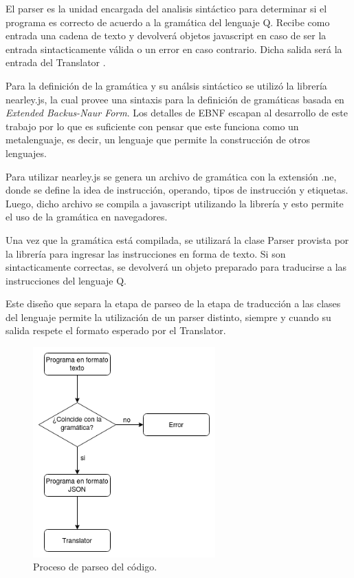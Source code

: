 El parser es la unidad encargada del analisis sintáctico para determinar si el programa es correcto de acuerdo a la gramática del lenguaje Q. 
Recibe como entrada una cadena de texto y devolverá objetos javascript en caso de ser la entrada sintacticamente válida o un error en caso 
contrario. Dicha salida será la entrada del Translator .

Para la definición de la gramática y su análsis sintáctico se utilizó la librería nearley.js, la cual provee una sintaxis para la definición de 
gramáticas basada en \textit{Extended Backus-Naur Form}. Los detalles de EBNF escapan al desarrollo de este trabajo por lo que es suficiente con 
pensar que este funciona como un metalenguaje, es decir, un lenguaje que permite la construcción de otros lenguajes. 

Para utilizar nearley.js se genera un archivo de gramática con la extensión .ne, donde se define la idea de instrucción, operando, tipos de 
instrucción y etiquetas. Luego, dicho archivo se compila a javascript utilizando la librería y esto permite el uso de la gramática en navegadores.

Una vez que la gramática está compilada, se utilizará la clase Parser provista por la librería para ingresar las instrucciones en forma de texto. 
Si son sintacticamente correctas, se devolverá un objeto preparado para traducirse a las instrucciones del lenguaje Q.

Este diseño que separa la etapa de parseo de la etapa de traducción a las clases del lenguaje permite la utilización de un parser distinto, siempre y cuando
su salida respete el formato esperado por el Translator.

\begin{figure}[H]
  \centering
  \includegraphics[width=7cm]{figuras/parser.png}
  \caption{Proceso de parseo del código.}
\end{figure}


